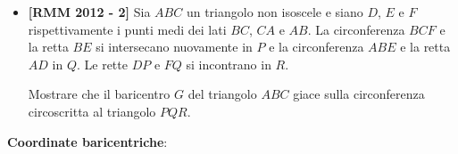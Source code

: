 \begin{itemize}
 
 
 \item \textbf{[RMM 2012 - 2]} Sia $ABC$ un triangolo non isoscele e siano $D$, $E$ e $F$ rispettivamente i punti medi dei lati $BC$, $CA$ e $AB$. La circonferenza $BCF$ e la retta $BE$ si intersecano nuovamente in $P$ e la circonferenza $ABE$ e la retta $AD$ in $Q$. Le rette $DP$ e $FQ$ si incontrano in $R$. 
 
 Mostrare che il baricentro $G$ del triangolo $ABC$ giace sulla circonferenza circoscritta al triangolo $PQR$.
 
\end{itemize}
\textbf{Coordinate baricentriche}:
